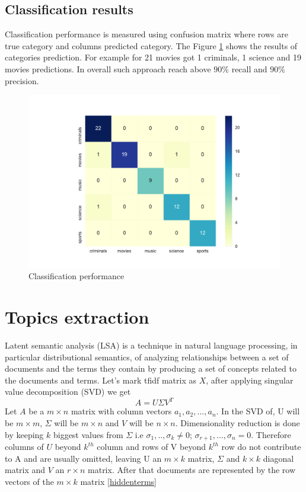 \documentclass{article}
\begin{document}
\subsection{Classification results}
Classification performance is measured using confusion matrix where rows are true category and columns predicted category. The  Figure \ref{confusion matrix} shows the results of categories prediction. For example  for 21 movies  got 1 criminals, 1 science and 19 movies predictions. In overall such approach reach above $90 \%$  recall and $90 \%$ precision.
\begin{figure}[H]
  \includegraphics[width=\linewidth]{images/confussion_matrix.pdf}
  \caption{Classification performance}
  \label{confusion matrix}
\end{figure}

\section{Topics extraction}
Latent semantic analysis (LSA) is a technique in natural language processing, in particular distributional semantics, of analyzing relationships between a set of documents and the terms they contain by producing a set of concepts related to the documents and terms. Let's mark tfidf matrix as $X$, after applying singular value decomposition (SVD) we get 
\begin{equation}
\label{LSA}
A =U\Sigma V^T
\end{equation}
Let $A$ be a $m \times n$ matrix with column vectors $a_1, a_2, ..., a_n$. In the SVD of, U will be $m \times m$, $\Sigma$ will be $m \times n$ and $V$ will be $n \times n$. Dimensionality reduction is done by keeping  $k$ biggest  values from $\Sigma$ i.e $\sigma_1,..,\sigma_k \neq 0$; $\sigma_{r+1},...,\sigma_n = 0$. Therefore columns of $U$ beyond $k^{th}$ column and rows of V beyond $k^{th}$ row do not contribute to A and are usually omitted, leaving U an  $m \times k$ matrix, $\Sigma$ and  $k \times k$ diagonal matrix and $V$ an  $r \times n$ matrix. After that documents are represented by the row vectors of the $m \times k$ matrix \ref{hiddenterms}
\end{document}
